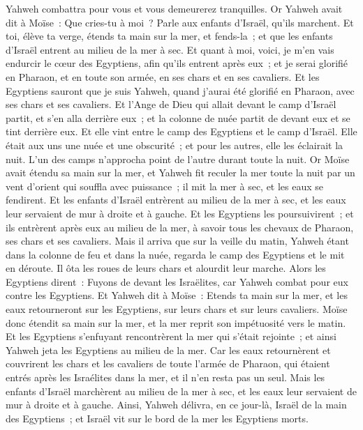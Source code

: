 \begin{multicols}{2}
Yahweh combattra pour vous et vous demeurerez tranquilles.
Or Yahweh avait dit à Moïse~: Que cries-tu à moi~? Parle aux enfants d'Israël, qu'ils marchent.
Et toi, élève ta verge, étends ta main sur la mer, et fends-la~; et que les enfants d'Israël entrent au milieu de la mer à sec.
 Et quant à moi, voici, je m'en vais endurcir le cœur des Egyptiens, afin qu'ils entrent après eux~; et je serai glorifié en Pharaon, et en toute son armée, en ses chars et en ses cavaliers.
Et les Egyptiens sauront que je suis Yahweh, quand j'aurai été glorifié en Pharaon, avec ses chars et ses cavaliers.
Et l'Ange de Dieu qui allait devant le camp d'Israël partit, et s'en alla derrière eux~; et la colonne de nuée partit de devant eux et se tint derrière eux.
Et elle vint entre le camp des Egyptiens et le camp d'Israël. Elle était aux uns une nuée et une obscurité~; et pour les autres, elle les éclairait la nuit. L'un des camps n'approcha point de l'autre durant toute la nuit.
Or Moïse avait étendu sa main sur la mer, et Yahweh fit reculer la mer toute la nuit par un vent d'orient qui souffla avec puissance~; il mit la mer à sec, et les eaux se fendirent.
Et les enfants d'Israël entrèrent au milieu de la mer à sec, et les eaux leur servaient de mur à droite et à gauche.
Et les Egyptiens les poursuivirent~; et ils entrèrent après eux au milieu de la mer, à savoir tous les chevaux de Pharaon, ses chars et ses cavaliers.
Mais il arriva que sur la veille du matin, Yahweh étant dans la colonne de feu et dans la nuée, regarda le camp des Egyptiens et le mit en déroute.
Il ôta les roues de leurs chars et alourdit leur marche. Alors les Egyptiens dirent~: Fuyons de devant les Israëlites, car Yahweh combat pour eux contre les Egyptiens.
Et Yahweh dit à Moïse~: Etends ta main sur la mer, et les eaux retourneront sur les Egyptiens, sur leurs chars et sur leurs cavaliers.
Moïse donc étendit sa main sur la mer, et la mer reprit son impétuosité vers le matin. Et les Egyptiens s'enfuyant rencontrèrent la mer qui s'était rejointe~; et ainsi Yahweh jeta les Egyptiens au milieu de la mer.
Car les eaux retournèrent et couvrirent les chars et les cavaliers de toute l'armée de Pharaon, qui étaient entrés après les Israélites dans la mer, et il n'en resta pas un seul.
Mais les enfants d'Israël marchèrent au milieu de la mer à sec, et les eaux leur servaient de mur à droite et à gauche.
Ainsi, Yahweh délivra, en ce jour-là, Israël de la main des Egyptiens~; et Israël vit sur le bord de la mer les Egyptiens morts.

\end{multicols}
